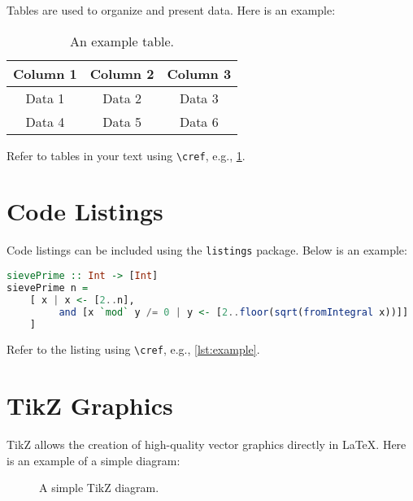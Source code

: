 Tables are used to organize and present data. Here is an example:

\begin{table}[h!]
    \centering
    \begin{tabular}{|c|c|c|}
        \hline
        Column 1 & Column 2 & Column 3 \\
        \hline
        Data 1   & Data 2   & Data 3   \\
        Data 4   & Data 5   & Data 6   \\
        \hline
    \end{tabular}
    \caption{An example table.}
    \label{tab:example}
\end{table}

Refer to tables in your text using \texttt{\textbackslash cref}, e.g., \cref{tab:example}.

\section{Code Listings}

Code listings can be included using the \texttt{listings} package. Below is an example:
\begin{lstlisting}[language=Haskell, caption={An example Haskell code listing.}, label={lst:example}]
sievePrime :: Int -> [Int]
sievePrime n = 
    [ x | x <- [2..n],
         and [x `mod` y /= 0 | y <- [2..floor(sqrt(fromIntegral x))]]
    ]
\end{lstlisting}
Refer to the listing using \texttt{\textbackslash cref}, e.g., \cref{lst:example}.

\section{TikZ Graphics}

TikZ allows the creation of high-quality vector graphics directly in LaTeX. Here is an example of a simple diagram:

\begin{figure}[h!]
    \centering
    \caption{A simple TikZ diagram.}
    \label{fig:tikz_example}
\end{figure}

